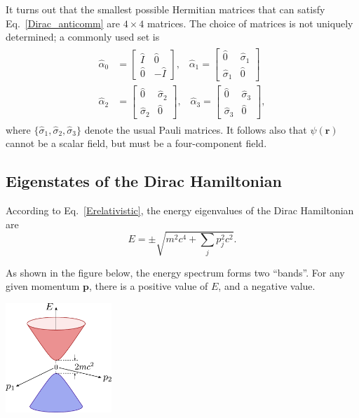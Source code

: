 \documentclass[pra,12pt]{revtex4}
\begin{document}
It turns out that the smallest possible Hermitian matrices that can
satisfy Eq.~\eqref{Dirac_anticomm} are $4\times4$ matrices.  The
choice of matrices is not uniquely determined; a commonly used set is
\begin{align}
  \begin{aligned}
    \hat{\alpha}_0 &= \begin{bmatrix}
      \hat{I}\, & \hat{0} \\ \hat{0} & -\hat{I}
    \end{bmatrix}, \;\;\;
    \hat{\alpha}_1 = \begin{bmatrix}
      \hat{0} & \hat{\sigma}_1 \\ \hat{\sigma}_1 & \hat{0}
    \end{bmatrix} \\
    \hat{\alpha}_2 &= \begin{bmatrix}
      \hat{0} & \hat{\sigma}_2 \\ \hat{\sigma}_2 & \hat{0}
    \end{bmatrix}, \;\;\;
    \hat{\alpha}_3 = \begin{bmatrix}
      \hat{0} & \hat{\sigma}_3 \\ \hat{\sigma}_3 & \hat{0}
    \end{bmatrix},
  \end{aligned}
  \label{alpha_matrices}
\end{align}
where $\{\hat{\sigma}_{1}, \hat{\sigma}_{2}, \hat{\sigma}_{3}\}$
denote the usual Pauli matrices.  It follows also that
$\psi(\mathbf{r})$ cannot be a scalar field, but must be a
four-component field.

\subsection{Eigenstates of the Dirac Hamiltonian}

According to Eq.~\eqref{Erelativistic}, the energy eigenvalues of the
Dirac Hamiltonian are
\begin{equation}
  E = \pm \sqrt{m^2c^4 + \sum_{j} p_j^2c^2}.
\end{equation}

\pagebreak

As shown in the figure below, the energy spectrum forms two ``bands''.
For any given momentum $\mathbf{p}$, there is a positive value of $E$,
and a negative value.

\begin{center}
  \includegraphics[width=0.3\textwidth]{diraccone}
\end{center}
\end{document}
